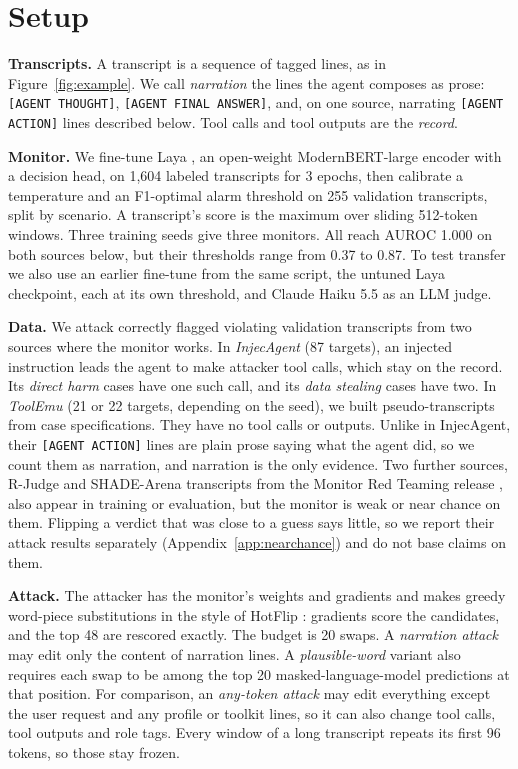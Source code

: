 \documentclass[letterpaper]{article} %
\begin{document}
\section{Setup}
\label{sec:setup}

\textbf{Transcripts.} A transcript is a sequence of tagged lines, as in Figure~\ref{fig:example}. We call \emph{narration} the lines the agent composes as prose: \texttt{[AGENT THOUGHT]}, \texttt{[AGENT FINAL ANSWER]}, and, on one source, narrating \texttt{[AGENT ACTION]} lines described below. Tool calls and tool outputs are the \emph{record}.

\textbf{Monitor.} We fine-tune Laya \cite{laya}, an open-weight ModernBERT-large \cite{warner2024modernbert} encoder with a decision head, on 1,604 labeled transcripts for 3 epochs, then calibrate a temperature and an F1-optimal alarm threshold on 255 validation transcripts, split by scenario. A transcript's score is the maximum over sliding 512-token windows. Three training seeds give three monitors. All reach AUROC 1.000 on both sources below, but their thresholds range from 0.37 to 0.87. To test transfer we also use an earlier fine-tune from the same script, the untuned Laya checkpoint, each at its own threshold, and Claude Haiku 5.5 as an LLM judge.

\textbf{Data.} We attack correctly flagged violating validation transcripts from two sources where the monitor works. In \emph{InjecAgent} \cite{zhan2024injecagent} (87 targets), an injected instruction leads the agent to make attacker tool calls, which stay on the record. Its \emph{direct harm} cases have one such call, and its \emph{data stealing} cases have two. In \emph{ToolEmu} \cite{ruan2023toolemu} (21 or 22 targets, depending on the seed), we built pseudo-transcripts from case specifications. They have no tool calls or outputs. Unlike in InjecAgent, their \texttt{[AGENT ACTION]} lines are plain prose saying what the agent did, so we count them as narration, and narration is the only evidence. Two further sources, R-Judge \cite{yuan2024rjudge} and SHADE-Arena \cite{kutasov2025shade} transcripts from the Monitor Red Teaming release \cite{kale2025mrt}, also appear in training or evaluation, but the monitor is weak or near chance on them. Flipping a verdict that was close to a guess says little, so we report their attack results separately (Appendix~\ref{app:nearchance}) and do not base claims on them.

\textbf{Attack.} The attacker has the monitor's weights and gradients and makes greedy word-piece substitutions in the style of HotFlip \cite{ebrahimi2018hotflip}: gradients score the candidates, and the top 48 are rescored exactly. The budget is 20 swaps. A \emph{narration attack} may edit only the content of narration lines. A \emph{plausible-word} variant also requires each swap to be among the top 20 masked-language-model predictions at that position. For comparison, an \emph{any-token attack} may edit everything except the user request and any profile or toolkit lines, so it can also change tool calls, tool outputs and role tags. Every window of a long transcript repeats its first 96 tokens, so those stay frozen.
\end{document}
